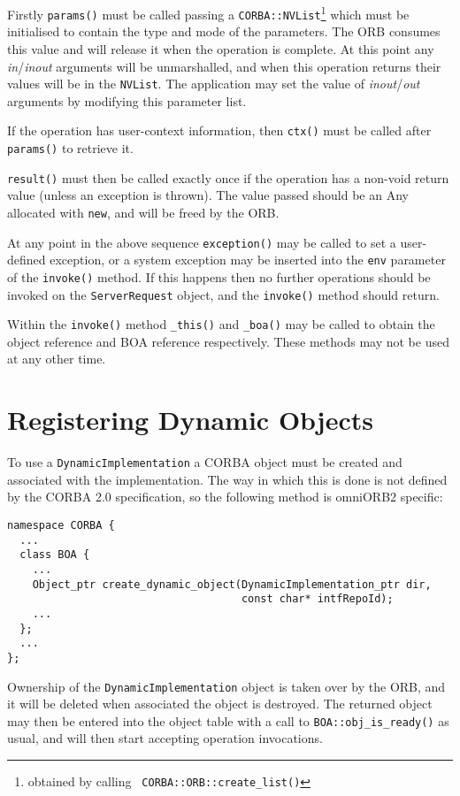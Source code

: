\documentclass[11pt,twoside,onecolumn]{book}
\begin{document}
Firstly {\tt params()} must be called passing a
{\tt CORBA::NVList}\footnote{obtained by calling {\tt
CORBA::ORB::create\_list()}}
which must be initialised to contain the type and mode of the parameters.
The ORB consumes this
value and will release it when the operation is complete. At this point any
\emph{in}/\emph{inout} arguments will be unmarshalled, and when this operation
returns their values will be in the {\tt NVList}. The application may set
the value of \emph{inout}/\emph{out} arguments by modifying this
parameter list.

If the operation has user-context information, then {\tt ctx()} must be
called after {\tt params()} to retrieve it.

{\tt result()} must then be called exactly once if the operation has a non-void
return value (unless an exception is thrown). The value passed should be
an Any allocated with {\tt new}, and will be freed by the ORB.

At any point in the above sequence {\tt exception()} may be called to set
a user-defined exception, or a system exception may be inserted into
the {\tt env} parameter of the {\tt invoke()} method. If this happens then no
further operations should be invoked on the {\tt ServerRequest} object, and
the {\tt invoke()} method should return.

Within the {\tt invoke()} method {\tt \_this()} and {\tt \_boa()} may be
called to obtain the object reference and BOA reference respectively. These
methods may not be used at any other time.


\section{Registering Dynamic Objects}

To use a {\tt DynamicImplementation} a CORBA object must be created and
associated with the implementation. The way in which this is done is not
defined by the CORBA 2.0 specification, so the following method is omniORB2
specific:

{\small \begin{verbatim}
namespace CORBA {
  ...
  class BOA {
    ...
    Object_ptr create_dynamic_object(DynamicImplementation_ptr dir,
                                     const char* intfRepoId);
    ...
  };
  ...
};
\end{verbatim}}

Ownership of the {\tt DynamicImplementation} object is taken over by the ORB,
and it will be deleted when associated the object is destroyed.
The returned object may then be entered into the object table with a call to
{\tt BOA::obj\_is\_ready()} as usual, and will then start accepting operation
invocations.
\end{document}
